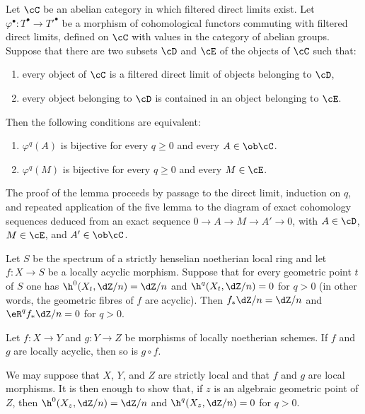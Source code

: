 \begin{lemma}\label{I:5-1-8}
Let $\cC$ be an abelian category in which filtered direct limits exist.
Let $\varphi^\bullet:T^\bullet\to{T'}^\bullet$ be a morphism of
cohomological functors commuting with filtered direct limits, defined on
$\cC$ with values in the category of abelian groups. Suppose that there
are two subsets $\cD$ and $\cE$ of the objects of $\cC$ such that:
\begin{enumerate}[\indent a)]
  \item every object of $\cC$ is a filtered direct limit of objects
    belonging to $\cD$,
  \item every object belonging to $\cD$ is contained in an object
    belonging to $\cE$.
\end{enumerate}
Then the following conditions are equivalent:
\begin{enumerate}[\indent (i)]
  \item $\varphi^q(A)$ is bijective for every $q\geqslant0$ and every
    $A\in\ob\cC$.
  \item $\varphi^q(M)$ is bijective for every $q\geqslant0$ and every
    $M\in\cE$.
\end{enumerate}
\end{lemma}

The proof of the lemma proceeds by passage to the direct limit, induction
on $q$, and repeated application of the five lemma to the diagram of
exact cohomology sequences deduced from an exact sequence
$0\to A\to M\to A'\to0$, with $A\in\cD$, $M\in\cE$, and
$A'\in\ob\cC$.

\begin{corollary}\label{I:5-1-9}
Let $S$ be the spectrum of a strictly henselian noetherian local ring and
let $f:X\to S$ be a locally acyclic morphism. Suppose that for every
geometric point $t$ of $S$ one has $\h^0(X_t,\dZ/n)=\dZ/n$ and
$\h^q(X_t,\dZ/n)=0$ for $q>0$ (in other words, the geometric fibres of
$f$ are acyclic). Then $f_*\dZ/n=\dZ/n$ and
$\eR^qf_*\dZ/n=0$ for $q>0$.
\end{corollary}

\begin{corollary}\label{I:5-1-10}
Let $f:X\to Y$ and $g:Y\to Z$ be morphisms of locally noetherian
schemes. If $f$ and $g$ are locally acyclic, then so is $g\circ f$.
\end{corollary}

We may suppose that $X$, $Y$, and $Z$ are strictly local and that $f$
and $g$ are local morphisms. It is then enough to show that, if $z$ is
an algebraic geometric point of $Z$, then
$\h^0(X_z,\dZ/n)=\dZ/n$ and $\h^q(X_z,\dZ/n)=0$ for $q>0$.

